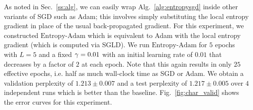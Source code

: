 \documentclass[10pt]{article}
\newcommand{\entropyadam}{\mathrm{Entropy}\textrm{-}\mathrm{Adam}}
\begin{document}
As noted in Sec.~\ref{ss:alg}, we can easily wrap Alg.~\ref{alg:entropysgd} inside other variants of SGD such as Adam; this involves simply substituting the local entropy gradient in place of the usual back-propagated gradient. For this experiment, we constructed $\entropyadam$ which is equivalent to Adam with the local entropy gradient (which is computed via SGLD). We run $\entropyadam$ for $5$ epochs with $L = 5$ and a fixed $\gamma = 0.01$ with an initial learning rate of $0.01$ that decreases by a factor of $2$ at each epoch. Note that this again results in only $25$ effective epochs, i.e. half as much wall-clock time as SGD or Adam. We obtain a validation perplexity of $1.213 \pm 0.007$ and a test perplexity of $1.217 \pm 0.005$ over $4$ independent runs which is better than the baseline. Fig.~\ref{fig:char_valid} shows the error curves for this experiment.
\end{document}
